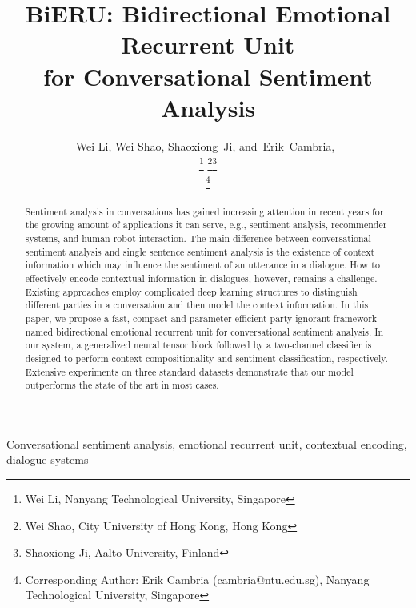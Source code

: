 \documentclass[journal]{IEEEtran}
\title{BiERU: Bidirectional Emotional Recurrent Unit \\for Conversational Sentiment Analysis}
\author{Wei Li,
        Wei Shao,
        Shaoxiong~Ji,
        and~Erik~Cambria,~\IEEEmembership{Senior Member,~IEEE}

\thanks{Wei Li, Nanyang Technological University, Singapore}
\thanks{Wei Shao, City University of Hong Kong, Hong Kong}\thanks{Shaoxiong Ji, Aalto University, Finland}

\thanks{Corresponding Author: Erik Cambria (cambria@ntu.edu.sg), Nanyang Technological University, Singapore}
}
\date{}
\begin{document}
\maketitle
\begin{abstract}
Sentiment analysis in conversations has gained increasing attention in recent years for the growing amount of applications it can serve, e.g., sentiment analysis, recommender systems, and human-robot interaction. The main difference between conversational sentiment analysis and single sentence sentiment analysis is the existence of context information which may influence the sentiment of an utterance in a dialogue. How to effectively encode contextual information in dialogues, however, remains a challenge. Existing approaches employ complicated deep learning structures to distinguish different parties in a conversation and then model the context information. In this paper, we propose a fast, compact and parameter-efficient party-ignorant framework named bidirectional emotional recurrent unit for conversational sentiment analysis. In our system, a generalized neural tensor block followed by a two-channel classifier is designed to perform context compositionality and sentiment classification, respectively. Extensive experiments on three standard datasets demonstrate that our model outperforms the state of the art in most cases.
\end{abstract}

\begin{IEEEkeywords}
Conversational sentiment analysis, emotional recurrent unit, contextual encoding, dialogue systems
\end{IEEEkeywords}
\end{document}
